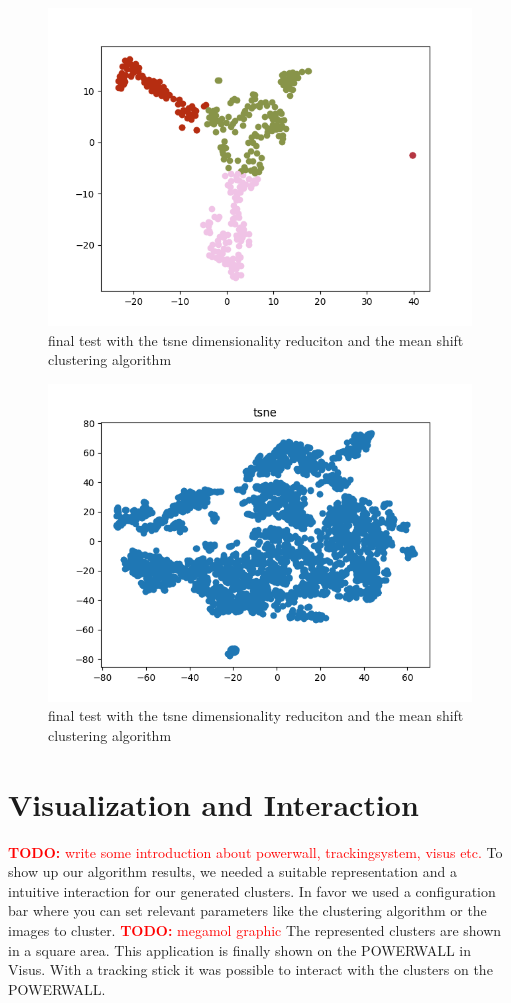 \documentclass[journal]{vgtc}       %
\newcommand{\todo}[1]{\textcolor{red}{\textbf{TODO:} #1}}
\begin{document}
\begin{figure}[tb]
	\begin{center}
		\includegraphics[width=.75\linewidth]{MS-tsne.png}
	\end{center}
	\caption{\label{fig:tsne} final test with the tsne dimensionality reduciton and the mean shift clustering algorithm }
\end{figure}

\begin{figure}[tb]
	\begin{center}
		\includegraphics[width=.75\linewidth]{tsneFull.png}
	\end{center}
	\caption{\label{fig:tsnef} final test with the tsne dimensionality reduciton and the mean shift clustering algorithm }
\end{figure}

\section{Visualization and Interaction}
\todo{write some introduction about powerwall, trackingsystem, visus etc.}
To show up our algorithm results, we needed a suitable representation and a intuitive interaction for our generated clusters. In favor we used a configuration bar where you can set relevant parameters like the clustering algorithm or the images to cluster. \todo{megamol graphic} The represented clusters are shown in a square area. This application is finally shown on the POWERWALL in Visus. With a tracking stick it was possible to interact with the clusters on the POWERWALL.
\end{document}
